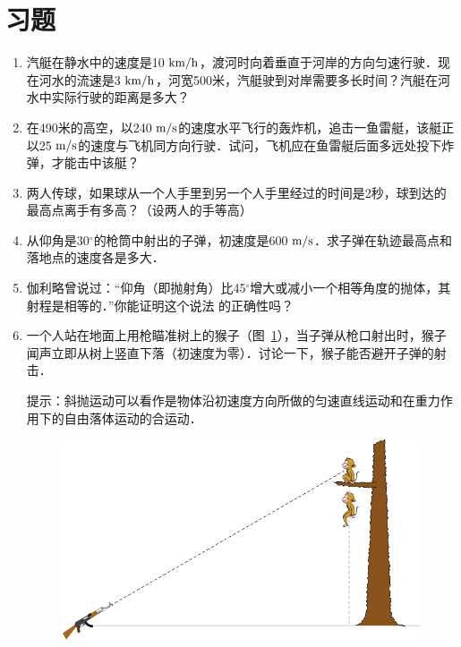 \section*{习题}

\begin{enumerate}
    \item 汽艇在静水中的速度是10$\;\text{km}/\text{h}$，渡河时向着垂直于河岸的方向匀速行驶．现在河水的流速是3$\;\text{km}/\text{h}$，河宽500米，汽艇驶到对岸需要多长时间？汽艇在河水中实际行驶的距离是多大？
\item 在490米的高空，以240$\;\text{m}/\text{s}$的速度水平飞行的轰炸机，追击一鱼雷艇，该艇正以25$\;\text{m}/\text{s}$的速度与飞机同方向行驶．试问，飞机应在鱼雷艇后面多远处投下炸弹，才能击中该艇？
\item 两人传球，如果球从一个人手里到另一个人手里经过的时间是2秒，球到达的最高点离手有多高？（设两人的手等高）
\item 从仰角是30$^\circ$的枪筒中射出的子弹，初速度是600$\;\text{m}/\text{s}$．求子弹在轨迹最高点和落地点的速度各是多大．
\item 伽利略曾说过：“仰角（即抛射角）比45$^\circ$增大或减小一个相等角度的抛体，其射程是相等的．”你能证明这个说法
的正确性吗？
\item 一个人站在地面上用枪瞄准树上的猴子（图~\ref{fig_A_4-32}），当子弹从枪口射出时，猴子闻声立即从树上竖直下落（初速度为零）．讨论一下，猴子能否避开子弹的射击．

提示：斜抛运动可以看作是物体沿初速度方向所做的匀速直线运动和在重力作用下的自由落体运动的合运动．

\begin{figure}[htbp]
    \centering
    \includegraphics{fig/A/4-32.pdf}
    \caption{}\label{fig_A_4-32}
\end{figure}


\end{enumerate}
